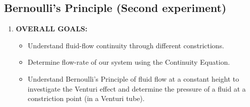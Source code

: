 \subsection{Bernoulli's Principle (Second experiment)}

\begin{enumerate}

\item \textbf{OVERALL GOALS:} 
\begin{itemize}
    \item Understand fluid-flow continuity through different constrictions.
    \item Determine flow-rate of our system using the Continuity Equation.
    \item Understand Bernoulli's Principle of fluid flow at a constant height to investigate the Venturi effect and determine the pressure of a fluid at a constriction point (in a Venturi tube).
\end{itemize}



\end{enumerate}
